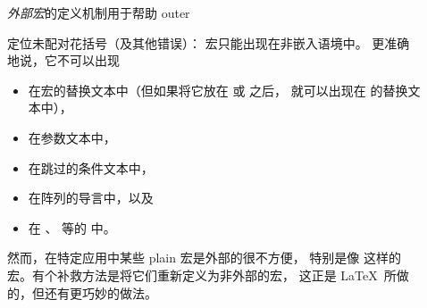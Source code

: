 \documentclass{book}
\begin{document}
\begin{description}
\item []
\emph{外部宏}的定义机制用于帮助%
\cstoidx outer\par
定位未配对花括号（及其他错误）： 宏只能出现在非嵌入语境中。
更准确地说，它不可以出现
\begin{itemize}
\item 在宏的替换文本中（但如果将它放在  或  之后，
就可以出现在  的替换文本中），
\item 在参数文本中，
\item 在跳过的条件文本中，
\item 在阵列的导言中，以及
\item 在 、 等的  中。
\end{itemize}
然而，在特定应用中某些 plain 宏是外部的很不方便，
特别是像  这样的宏。有个补救方法是将它们重新定义为非外部的宏，
这正是 \LaTeX\ 所做的，但还有更巧妙的做法。



\end{description}
\end{document}
